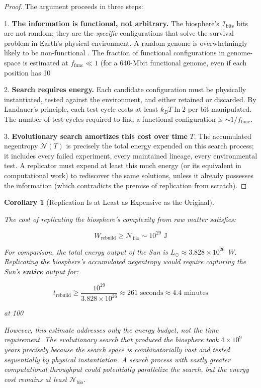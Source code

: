 \documentclass[11pt]{article}
\theoremstyle{plain}
\newtheorem{corollary}[theorem]{Corollary}
\theoremstyle{definition}
\theoremstyle{remark}
\begin{document}
\begin{proof}
The argument proceeds in three steps:

1. \textbf{The information is functional, not arbitrary.} The biosphere's $\mathcal{I}_{\text{bits}}$ bits are not random; they are the \emph{specific} configurations that solve the survival problem in Earth's physical environment. A random genome is overwhelmingly likely to be non-functional \citep{Adami2004}. The fraction of functional configurations in genome-space is estimated at $f_{\text{func}} \ll 1$ (for a 640-Mbit functional genome, even if each position has 10%

2. \textbf{Search requires energy.} Each candidate configuration must be physically instantiated, tested against the environment, and either retained or discarded. By Landauer's principle, each test cycle costs at least $k_B T \ln 2$ per bit manipulated. The number of test cycles required to find a functional configuration is $\sim 1/f_{\text{func}}$.

3. \textbf{Evolutionary search amortizes this cost over time} $T$. The accumulated negentropy $\mathcal{N}(T)$ is precisely the total energy expended on this search process; it includes every failed experiment, every maintained lineage, every environmental test. A replicator must expend at least this much energy (or its equivalent in computational work) to rediscover the same solutions, unless it already possesses the information (which contradicts the premise of replication from scratch).
\end{proof}

\begin{corollary}[Replication Is at Least as Expensive as the Original]
\label{cor-replication-cost}

The cost of replicating the biosphere's complexity from raw matter satisfies:

$$W_{\text{rebuild}} \geq \mathcal{N}_{\text{bio}} \sim 10^{29} \text{ J}$$

For comparison, the total energy output of the Sun is $L_\odot \approx 3.828 \times 10^{26}$ W. Replicating the biosphere's accumulated negentropy would require capturing the Sun's \textbf{entire} output for:

$$t_{\text{rebuild}} \geq \frac{10^{29}}{3.828 \times 10^{26}} \approx 261 \text{ seconds} \approx 4.4 \text{ minutes}$$

at 100%

However, this estimate addresses only the energy budget, not the time requirement. The evolutionary search that produced the biosphere took $4 \times 10^9$ years precisely because the search space is combinatorially vast and tested sequentially by physical instantiation. A search process with vastly greater computational throughput could potentially parallelize the search, but the energy cost remains at least $\mathcal{N}_{\text{bio}}$.
\end{corollary}
\end{document}
